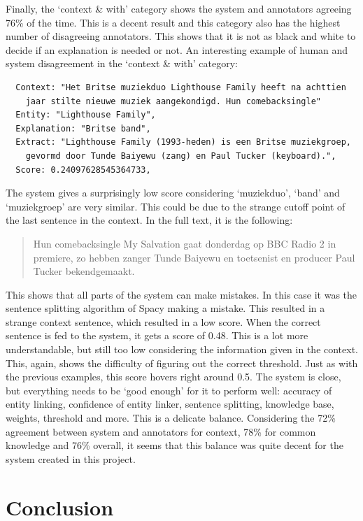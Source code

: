 \documentclass[
10pt, %
a4paper, %
oneside, %
headinclude,footinclude, %
] {book}%
\begin{document}
Finally, the `context \& with' category shows the system and annotators agreeing 76\% of the time.
This is a decent result and this category also has the highest number of disagreeing annotators.
This shows that it is not as black and white to decide if an explanation is needed or not.
An interesting example of human and system disagreement in the `context \& with' category:

\begin{verbatim}
  Context: "Het Britse muziekduo Lighthouse Family heeft na achttien
    jaar stilte nieuwe muziek aangekondigd. Hun comebacksingle"
  Entity: "Lighthouse Family",
  Explanation: "Britse band",
  Extract: "Lighthouse Family (1993-heden) is een Britse muziekgroep,
    gevormd door Tunde Baiyewu (zang) en Paul Tucker (keyboard).",
  Score: 0.24097628545364733,
\end{verbatim}

The system gives a surprisingly low score considering `muziekduo', `band' and `muziekgroep' are very similar.
This could be due to the strange cutoff point of the last sentence in the context. 
In the full text, it is the following:

\begin{quote}
  Hun comebacksingle My Salvation gaat donderdag op BBC Radio 2 in premiere, zo hebben zanger Tunde Baiyewu en toetsenist en producer Paul Tucker bekendgemaakt.
\end{quote}

This shows that all parts of the system can make mistakes.
In this case it was the sentence splitting algorithm of Spacy making a mistake.
This resulted in a strange context sentence, which resulted in a low score.
When the correct sentence is fed to the system, it gets a score of 0.48. 
This is a lot more understandable, but still too low considering the information given in the context.
This, again, shows the difficulty of figuring out the correct threshold.
Just as with the previous examples, this score hovers right around 0.5.
The system is close, but everything needs to be `good enough' for it to perform well: accuracy of entity linking, confidence of entity linker, sentence splitting, knowledge base, weights, threshold and more.
This is a delicate balance.
Considering the 72\% agreement between system and annotators for context, 78\% for common knowledge and 76\% overall, it seems that this balance was quite decent for the system created in this project.

\chapter{Conclusion}
\end{document}
